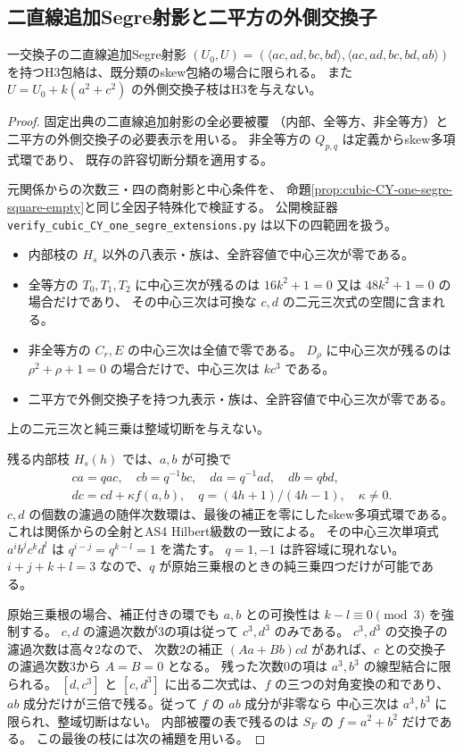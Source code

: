 \subsection{二直線追加Segre射影と二平方の外側交換子}
\begin{proposition}\label{prop:cubic-CY-one-segre-split}
一交換子の二直線追加Segre射影
$(U_0,U)=(\langle ac,ad,bc,bd\rangle,\langle ac,ad,bc,bd,ab\rangle)$
を持つH3包絡は、既分類のskew包絡の場合に限られる。
また $U=U_0+k(a^2+c^2)$ の外側交換子枝はH3を与えない。
\end{proposition}
\begin{proof}
固定出典\cite{AS4CYpinned}の二直線追加射影の全必要被覆
（内部、全等方、非全等方）と二平方の外側交換子の必要表示を用いる。
非全等方の $Q_{p,q}$ は定義からskew多項式環であり、
既存の許容切断分類を適用する。

元関係からの次数三・四の商射影と中心条件を、
命題\ref{prop:cubic-CY-one-segre-square-empty}と同じ全因子特殊化で検証する。
公開検証器\\
\texttt{verify\_cubic\_CY\_one\_segre\_extensions.py}\quad
は以下の四範囲を扱う。
\begin{itemize}
\item 内部枝の $H_s$ 以外の八表示・族は、全許容値で中心三次が零である。
\item 全等方の $T_0,T_1,T_2$ に中心三次が残るのは
$16k^2+1=0$ 又は $48k^2+1=0$ の場合だけであり、
その中心三次は可換な $c,d$ の二元三次式の空間に含まれる。
\item 非全等方の $C_r,E$ の中心三次は全値で零である。
$D_\rho$ に中心三次が残るのは $\rho^2+\rho+1=0$ の場合だけで、中心三次は $kc^3$ である。
\item 二平方で外側交換子を持つ九表示・族は、全許容値で中心三次が零である。
\end{itemize}
上の二元三次と純三乗は整域切断を与えない。

残る内部枝 $H_s(h)$ では、$a,b$ が可換で
\[
 \begin{gathered}
 ca=qac,\quad cb=q^{-1}bc,\quad da=q^{-1}ad,\quad db=qbd,\\
 dc=cd+\kappa f(a,b),\quad q=(4h+1)/(4h-1),\quad \kappa\ne0 .
 \end{gathered}
\]
$c,d$ の個数の濾過の随伴次数環は、最後の補正を零にしたskew多項式環である。
これは関係からの全射とAS4 Hilbert級数の一致による。
その中心三次単項式 $a^ib^jc^kd^l$ は $q^{i-j}=q^{k-l}=1$ を満たす。
$q=1,-1$ は許容域に現れない。
$i+j+k+l=3$ なので、$q$ が原始三乗根のときの純三乗四つだけが可能である。

原始三乗根の場合、補正付きの環でも $a,b$ との可換性は $k-l\equiv0\pmod3$ を強制する。
$c,d$ の濾過次数が3の項は従って $c^3,d^3$ のみである。
$c^3,d^3$ の交換子の濾過次数は高々2なので、
次数2の補正 $(Aa+Bb)cd$ があれば、$c$ との交換子の濾過次数3から $A=B=0$ となる。
残った次数0の項は $a^3,b^3$ の線型結合に限られる。
$[d,c^3]$ と $[c,d^3]$ に出る二次式は、$f$ の三つの対角変換の和であり、
$ab$ 成分だけが三倍で残る。従って $f$ の $ab$ 成分が非零なら
中心三次は $a^3,b^3$ に限られ、整域切断はない。
内部被覆の表で残るのは $S_F$ の $f=a^2+b^2$ だけである。
この最後の枝には次の補題を用いる。
\end{proof}

